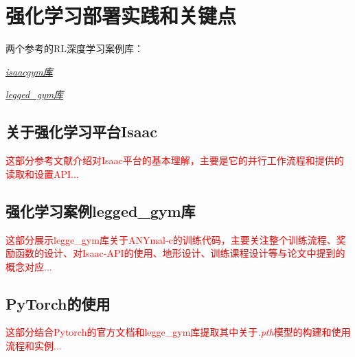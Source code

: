 
\chapter[强化学习部署实践和关键点]{强化学习部署实践和关键点}
\begin{note}
  两个参考的RL深度学习案例库：

  \emph{\href{https://github.com/DaojiePENG}{isaacgym库}}

  \emph{\href{https://github.com/DaojiePENG}{legged\_gym库}}
\end{note}

\section[强化学习平台Isaac]{关于强化学习平台Isaac\cite[p6-10]{Makoviychuk_Wawrzyniak_Guo_Lu_Storey_Macklin_Hoeller_Rudin_Allshire_Handa_et_al_2021}}

\textcolor{red}{\small
这部分参考文献介绍对Isaac平台的基本理解，主要是它的并行工作流程和提供的读取和设置API...}

\section[强化学习案例legged\_gym库]{强化学习案例legged\_gym库\cite[p1]{Rudin_Hoeller_Reist_Hutter_2021}}

\textcolor{red}{\small
这部分展示legge\_gym库关于ANYmal-c的训练代码，主要关注整个训练流程、奖励函数的设计、对Isaac-API的使用、地形设计、训练课程设计等与论文中提到的概念对应...}

\section[PyTorch的使用]{PyTorch的使用}
\textcolor{red}{\small
这部分结合Pytorch的官方文档和legge\_gym库提取其中关于\emph{.pth}模型的构建和使用流程和实例...
}